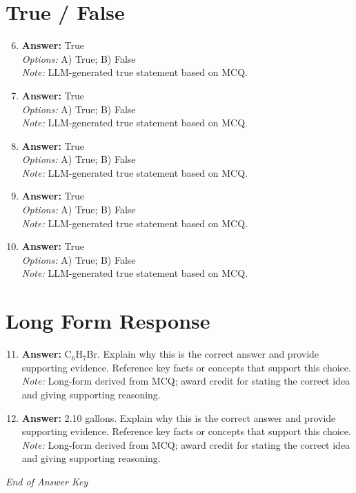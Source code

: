 \documentclass[12pt]{article}
\begin{document}
\section*{True / False}
\begin{enumerate}[label=\arabic*.]
\setcounter{enumi}{5}
\item \textbf{Answer:} True
\\ \textit{Options:} A) True; B) False
\\ \textit{Note:} LLM-generated true statement based on MCQ.
\item \textbf{Answer:} True
\\ \textit{Options:} A) True; B) False
\\ \textit{Note:} LLM-generated true statement based on MCQ.
\item \textbf{Answer:} True
\\ \textit{Options:} A) True; B) False
\\ \textit{Note:} LLM-generated true statement based on MCQ.
\item \textbf{Answer:} True
\\ \textit{Options:} A) True; B) False
\\ \textit{Note:} LLM-generated true statement based on MCQ.
\item \textbf{Answer:} True
\\ \textit{Options:} A) True; B) False
\\ \textit{Note:} LLM-generated true statement based on MCQ.
\end{enumerate}

\section*{Long Form Response}
\begin{enumerate}[label=\arabic*.]
\setcounter{enumi}{10}
\item \textbf{Answer:} C$_{6}$H$_{7}$Br. Explain why this is the correct answer and provide supporting evidence. Reference key facts or concepts that support this choice.
\\ \textit{Note:} Long-form derived from MCQ; award credit for stating the correct idea and giving supporting reasoning.
\item \textbf{Answer:} 2.10 gallons. Explain why this is the correct answer and provide supporting evidence. Reference key facts or concepts that support this choice.
\\ \textit{Note:} Long-form derived from MCQ; award credit for stating the correct idea and giving supporting reasoning.
\end{enumerate}

\vfill
\noindent\textit{End of Answer Key}
\end{document}
